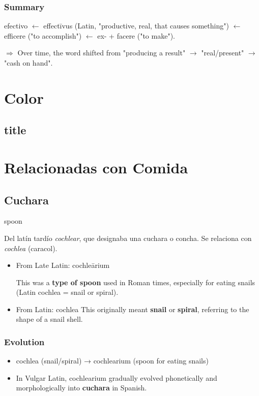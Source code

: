 \documentclass[10pt]{book}
\newcommand{\wordentry}[2]{
	\large #1
	\vspace{-0.5em}
	\begin{etymologybox}
		#2
	\end{etymologybox}
}
\let\oldsection\section
\renewcommand{\section}[1]{
	\needspace{8\baselineskip}
	\oldsection{#1}
}
\begin{document}
	\subsection{Summary}
	efectivo $\leftarrow$ effectīvus (Latin, "productive, real, that causes something") $\leftarrow$ efficere ("to accomplish") $\leftarrow$ ex- + facere ("to make").
	
	$\Rightarrow$ Over time, the word shifted from "producing a result" $\rightarrow$ "real/present" $\rightarrow$ "cash on hand".

\chapter{Color}

	\section{title}
\chapter{Relacionadas con Comida}
	
	\section{Cuchara}
	\wordentry{spoon}{
	Del latín tardío \textit{cochlear}, que designaba una cuchara o concha. Se relaciona con \textit{cochlea} (caracol).
	\begin{itemize}
		\item From Late Latin: cochleārium
		
		This was a \textbf{type of spoon} used in Roman times, especially for eating snails (Latin cochlea = snail or spiral).
		
		\item From Latin: cochlea
		This originally meant \textbf{snail} or \textbf{spiral}, referring to the shape of a snail shell.
	\end{itemize}
	}
	
	\subsection*{Evolution}
	\begin{itemize}
		\item cochlea (snail/spiral) → cochlearium (spoon for eating snails)
		
		\item In Vulgar Latin, cochlearium gradually evolved phonetically and morphologically into \textbf{cuchara} in Spanish.
	\end{itemize}
	
\end{document}
